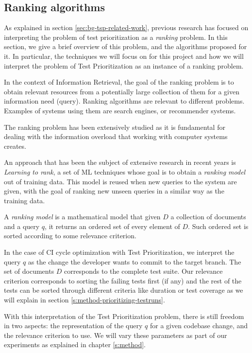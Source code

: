 \subsection{Ranking algorithms}

As explained in section \ref{sec:bg-tsp-related-work}, previous research has 
focused on interpreting the problem of test prioritization as a \emph{ranking} 
problem. In this section, we give a brief overview of this problem, and the algorithms proposed
for it. In particular, the techniques we will focus on for this project
and how we will interpret the problem of Test Prioritization as an instance
of a ranking problem.

In the context of Information Retrieval, the goal of the ranking problem is to obtain relevant resources
from a potentially large collection of them for a given information need (query). 
Ranking algorithms are relevant to different problems. Examples of systems using them are search engines, or 
recommender systems.

The ranking problem has been extensively studied as it is fundamental for dealing with the
information overload that working with computer systems creates.

An approach that has been the subject of extensive research in recent years is \emph{Learning to rank},
a set of ML techniques whose goal is to obtain a \emph{ranking model} out of
training data. This model is reused when new queries to the system are given,
with the goal of ranking new unseen queries in a similar way as the training data.

A \emph{ranking model} is a mathematical model that given $D$ a collection of documents
and a query $q$, it returns an ordered set of every element of $D$. Such ordered set is
sorted according to some relevance criterion.

In the case of CI cycle optimization with Test Prioritization, we interpret the query $q$ as the
change the developer wants to commit to the target branch. The set of documents $D$ corresponds to
the complete test suite. Our relevance criterion corresponds to sorting the
failing tests first (if any) and the rest of the tests can be sorted through different criteria
like duration or test coverage as we will explain in section \ref{s:method-prioritizing-testruns}.

With this interpretation of the Test Prioritization problem, there is still freedom 
in two aspects: the representation of the query $q$ for a given codebase change, and the 
relevance criterion to use. We will vary these parameters as part of our experiments 
as explained in chapter \ref{s:method}.

